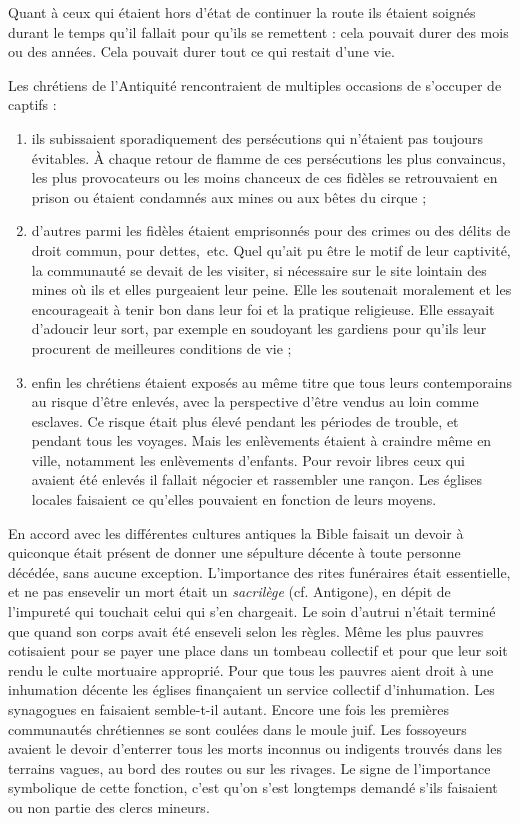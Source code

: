  Quant à ceux qui étaient hors d'état de continuer la route ils étaient soignés durant le temps qu'il fallait pour qu'ils se remettent : cela pouvait durer des mois ou des années. Cela pouvait durer tout ce qui restait d'une vie.



Les chrétiens de l'Antiquité rencontraient de multiples occasions de s'occuper de captifs :
\begin{enumerate}
\item ils subissaient sporadiquement des persécutions qui n'étaient pas toujours évitables. À chaque retour de flamme de ces persécutions les plus convaincus, les plus provocateurs ou les moins chanceux de ces fidèles se retrouvaient en prison ou étaient condamnés aux mines ou aux bêtes du cirque ;
\item d'autres parmi les fidèles étaient emprisonnés pour des crimes ou des délits de droit commun, pour dettes,~etc. Quel qu'ait pu être le motif de leur captivité, la communauté se devait de les visiter, si nécessaire sur le site lointain des mines où ils et elles purgeaient leur peine. Elle les soutenait moralement et les encourageait à tenir bon dans leur foi et la pratique religieuse. Elle essayait d'adoucir leur sort, par exemple en soudoyant les gardiens pour qu'ils leur procurent de meilleures conditions de vie ;
\item enfin les chrétiens étaient exposés au même titre que tous leurs contemporains au risque d'être enlevés, avec la perspective d'être vendus au loin comme esclaves. Ce risque était plus élevé pendant les périodes de trouble, et pendant tous les voyages. Mais les enlèvements étaient à craindre même en ville, notamment les enlèvements d'enfants. Pour revoir libres ceux qui avaient été enlevés il fallait négocier et rassembler une rançon. Les églises locales faisaient ce qu'elles pouvaient en fonction de leurs moyens. 
\end{enumerate}



En accord avec les différentes cultures antiques la Bible faisait un devoir à quiconque était présent de donner une sépulture décente à toute personne décédée, sans aucune exception. L'importance des rites funéraires
 était essentielle, et ne pas ensevelir un mort était un \emph{sacrilège} (cf. Antigone), en dépit de l'impureté qui touchait celui qui s'en chargeait. Le soin d'autrui n'était terminé que quand son corps avait été enseveli selon les règles. Même les plus pauvres cotisaient pour se payer une place dans un tombeau collectif et pour que leur soit rendu le culte mortuaire approprié. 
 Pour que tous les pauvres aient droit à une inhumation décente les églises finançaient un service collectif d'inhumation. Les synagogues en faisaient semble-t-il autant. Encore une fois les premières communautés chrétiennes se sont coulées dans le moule juif. Les fossoyeurs avaient le devoir d'enterrer tous les morts inconnus ou indigents trouvés dans les terrains vagues, au bord des routes ou sur les rivages. Le signe de l'importance symbolique de cette fonction, c'est qu'on s'est longtemps demandé s'ils faisaient ou non partie des clercs mineurs. 

